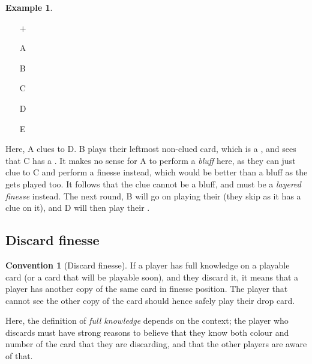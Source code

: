 \documentclass[a4paper]{article}
\theoremstyle{plain}
\theoremstyle{definition}
\newtheorem{example}[theorem]{Example}
\newtheorem{convention}[theorem]{Convention}
\begin{document}
\begin{example}	\hfill \\
	\begin{minipage}{0.45\textwidth}
		\begin{itemize}
			\item[\Large +]      
			\item[\Large A]    
			\item[\Large B]    
			\item[\Large C]    
			\item[\Large D]    
			\item[\Large E]    
		\end{itemize}
	\end{minipage}%
	\begin{minipage}{0.55\textwidth}
		Here, A clues  to D. B plays their leftmost non-clued card, which is a , and sees that C has a . It makes no sense for A to perform a \textit{bluff} here, as they can just clue  to C and perform a finesse instead, which would be better than a bluff as the  gets played too. It follows that the  clue cannot be a bluff, and must be a \emph{layered finesse} instead. The next round, B will go on playing their  (they skip  as it has a  clue on it), and D will then play their .
	\end{minipage}
\end{example} \vspace{0.15 cm}

\subsection{Discard finesse}

\begin{convention}[Discard finesse]
	If a player has full knowledge on a playable card (or a card that will be playable soon), and they discard it, it means that a player has another copy of the same card in finesse position. The player that cannot see the other copy of the card should hence safely play their drop card.
\end{convention}

Here, the definition of \emph{full knowledge} depends on the context; the player who discards must have strong reasons to believe that they know both colour and number of the card that they are discarding, and that the other players are aware of that.
\end{document}
